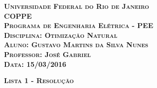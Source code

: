 \begin{titlepage}
\begin{flushleft}

\textsc{\textbf{\LARGE Universidade Federal do Rio de Janeiro}}\\[0.5cm]
\textsc{\textbf{\LARGE COPPE}}\\[0.5cm]
\textsc{\textbf{\LARGE Programa de Engenharia Elétrica - PEE}}\\[0.5cm]
\textsc{\textbf{\LARGE Disciplina: Otimização Natural}}\\[0.5cm]
\textsc{\textbf{\LARGE Aluno: Gustavo Martins da Silva Nunes}}\\[0.5cm]
\textsc{\textbf{\LARGE Professor: José Gabriel}}\\[0.5cm]
\textsc{\textbf{\LARGE Data: 15/03/2016}}\\[6.5cm]

\end{flushleft}
\begin{center}
\textsc{\textbf{\huge Lista 1 - Resolução}}
\vfill
\end{center}
\end{titlepage}